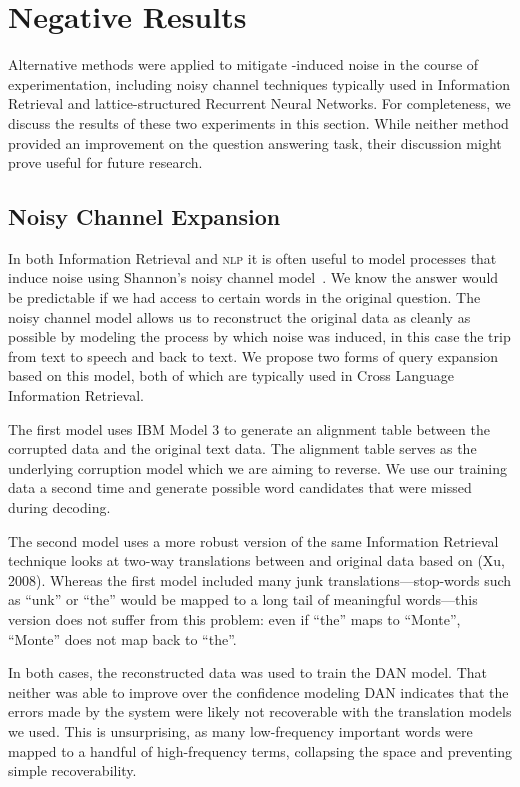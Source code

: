 \section{Negative Results}

Alternative methods were applied to mitigate \asr{}-induced noise in the course of experimentation, including noisy channel techniques typically used in Information Retrieval and lattice-structured Recurrent Neural Networks.
For completeness, we discuss the results of these two experiments in this section.
While neither method provided an improvement on the question answering task, their discussion might prove useful for future research.

\subsection{Noisy Channel Expansion}

In both Information Retrieval and \textsc{nlp} it is often useful to model processes that induce noise using Shannon's noisy channel model~\cite{shannon1948mathematical}.
We know the answer would be predictable if we had access to certain words in the original question.
The noisy channel model allows us to reconstruct the original data as cleanly as possible by modeling the process by which noise was induced, in this case the trip from text to speech and back to text.
We propose two forms of query expansion based on this model, both of which are typically used in Cross Language Information Retrieval.

The first model uses IBM Model 3 to generate an alignment table between the corrupted \asr{}  data and the original text data.
The alignment table serves as the underlying corruption model which we are aiming to reverse.
We use our training data a second time and generate possible word candidates that were missed during decoding.

The second model uses a more robust version of the same Information Retrieval technique looks at two-way translations between \asr{} and original data based on (Xu, 2008).
Whereas the first model included many junk translations---stop-words such as ``unk'' or ``the'' would be mapped to a long tail of meaningful words---this version does not suffer from this problem: even if ``the'' maps to ``Monte'', ``Monte'' does not map back to ``the''.

In both cases, the reconstructed data was used to train the \textsc{DAN} model.
That neither was able to improve over the confidence modeling \textsc{DAN} indicates that the errors made by the \asr{} system were likely not recoverable with the translation models we used.
This is unsurprising, as many low-frequency important words were mapped to a handful of high-frequency terms, collapsing the space and preventing simple recoverability.

